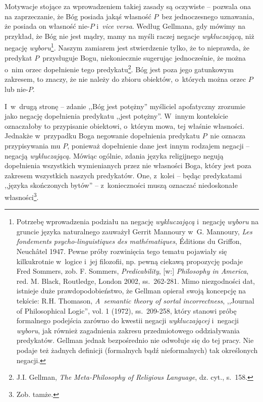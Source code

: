 Motywacje stojące za wprowadzeniem takiej zasady są oczywiste -- pozwala ona na zaprzeczanie, że Bóg posiada jakąś własność $P$~bez jednoczesnego uznawania, że posiada on własność nie-$P$ i~\textit{vice versa}. Według Gellmana, gdy mówimy na przykład, że Bóg nie jest mądry, mamy na myśli raczej negacje \textit{wykluczającą}, niż negację \textit{wyboru}\footnote{Potrzebę wprowadzenia podziału na negację \textit{wykluczającą} i~negację \textit{wyboru} na gruncie języka naturalnego zauważył Gerrit Mannoury w~G. Mannoury, \textit{Les fondements psycho-linguistiques des mathématiques}, Éditions du Griffon, Neuchâtel 1947. Pewne próby rozwinięcia tego tematu pojawiały się kilkukrotnie w~logice i~jej filozofii, np. pewną ciekawą propozycję podaje Fred Sommers, zob. F. Sommers, \textit{Predicability}, [w:] \textit{Philosophy in America}, red. M. Black, Routledge, London 2002, ss.~262-281. Mimo niezgodności dat, istnieje duże prawdopodobieństwo, że Gellman opierał swoją koncepcję na tekście: R.H. Thomason, \textit{A~semantic theory of sortal incorrectness}, ,,Journal of Philosophical Logic'', vol. 1 (1972), ss.~209-258, który stanowi próbę formalnego podejścia zarówno do kwestii negacji \textit{wykluczającej} i~negacji \textit{wyboru}, jak również zagadnienia zakresu przedmiotowego oddziaływania predykatów. Gellman jednak bezpośrednio nie odwołuje się do tej pracy. Nie podaje też żadnych definicji (formalnych bądź nieformalnych) tak określonych negacji.}. Naszym zamiarem jest stwierdzenie tylko, że to nieprawda, że predykat $P$~przysługuje Bogu, niekoniecznie sugerując jednocześnie, że można o~nim orzec dopełnienie tego predykatu\footnote{J.I. Gellman, \textit{The Meta-Philosophy of Religious Language}, dz. cyt., s.~158.}. Bóg jest poza jego gatunkowym zakresem, to znaczy, że nie należy do zbioru obiektów, o~których można orzec $P$ lub nie-$P$.

I~w~drugą stronę -- zdanie ,,Bóg jest potężny'' myśliciel apofatyczny zrozumie jako negację dopełnienia predykatu ,,jest potężny''. W~innym kontekście oznaczałoby to przypisanie obiektowi, o~którym mowa, tej właśnie własności. Jednakże w~przypadku Boga negowanie dopełnienia predykatu $P$~nie oznacza przypisywania mu $P$, ponieważ dopełnienie dane jest innym rodzajem negacji -- negacją \textit{wykluczającą}. Mówiąc ogólnie, zdania języka religijnego negują dopełnienia wszystkich wymienianych przez nie własności Boga, który jest poza zakresem wszystkich naszych predykatów. One, z~kolei -- będąc predykatami ,,języka skończonych bytów'' -- z~konieczności muszą oznaczać niedoskonałe własności\footnote{Zob. tamże.}.

